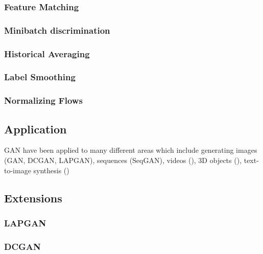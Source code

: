 \documentclass[twoside,11pt,a4paper]{article}
\theoremstyle{break}
\begin{document}
\subsubsection{Feature Matching}
\label{ssub:gan_feature_matching}

\subsubsection{Minibatch discrimination}
\label{ssub:gan_minibatch_discrimination}

\subsubsection{Historical Averaging}
\label{ssub:gan_historical_averaging}


\subsubsection{Label Smoothing}
\label{ssub:gan_label_smoothing}


\subsubsection{Normalizing Flows}
\label{ssub:gan_nf}









\subsection{Application}
\label{sub:gan_application}
GAN have been applied to many different areas which include generating images (GAN, DCGAN, LAPGAN), sequences (SeqGAN), videos (\cite{gan_video:2016}), 3D objects (\cite{gan_3d:2016}), text-to-image synthesis (\cite{gan_t2i:2016})
\subsection{Extensions}
\label{sub:gan_extensions}

\subsubsection{LAPGAN}
\label{ssub:lapgan}

\subsubsection{DCGAN}
\label{ssub:dcgan}
\end{document}
